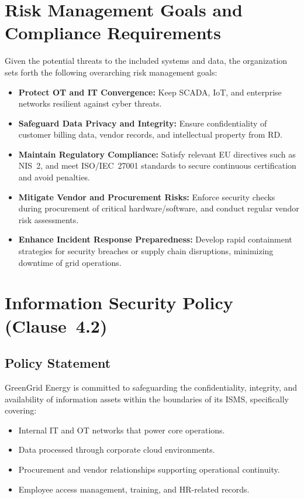 \section{Risk Management Goals and Compliance Requirements}
\label{sec:risk_goals_compliance}

Given the potential threats to the included systems and data, the organization
sets forth the following overarching risk management goals:

\begin{itemize}
      \item \textbf{Protect \ac{OT} and \ac{IT} Convergence:} Keep \ac{SCADA}, \ac{IoT}, and
            enterprise networks resilient against cyber threats.
      \item \textbf{Safeguard Data Privacy and Integrity:} Ensure
            confidentiality of customer billing data, vendor records, and
            intellectual property from \ac{RD}.
      \item \textbf{Maintain Regulatory Compliance:} Satisfy relevant
            \ac{EU} directives such as NIS~2, and meet ISO/IEC~27001 standards
            to secure continuous certification and avoid penalties.
      \item \textbf{Mitigate Vendor and Procurement Risks:} Enforce
            security checks during procurement of critical hardware/software,
            and conduct regular vendor risk assessments.
      \item \textbf{Enhance Incident Response Preparedness:} Develop
            rapid containment strategies for security breaches or supply
            chain disruptions, minimizing downtime of grid operations.
\end{itemize}

\section{Information Security Policy (Clause~4.2)}
\label{sec:infosec_policy}

\subsection*{Policy Statement}
GreenGrid Energy is committed to safeguarding the confidentiality,
integrity, and availability of information assets within the boundaries
of its \ac{ISMS}, specifically covering:
\begin{itemize}
      \item Internal \ac{IT} and \ac{OT} networks that power core operations.
      \item Data processed through corporate cloud environments.
      \item Procurement and vendor relationships supporting operational continuity.
      \item Employee access management, training, and \ac{HR}-related records.
\end{itemize}

